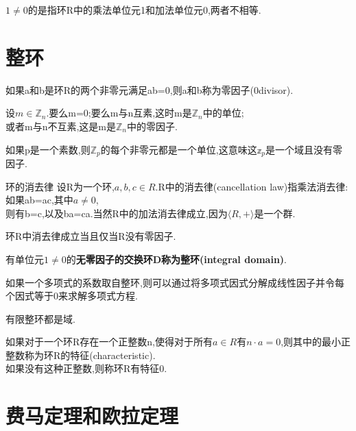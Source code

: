 \documentclass[oneside,openany]{ctexbook}
\begin{document}
$1\neq 0$的是指环R中的乘法单位元1和加法单位元0,两者不相等.

\section{整环}

\begin{definition}{}{}
如果a和b是环R的两个非零元满足ab=0,则a和b称为零因子(0divisor).
\end{definition}

\begin{definition}{}{}
设$m\in \mathbb{Z}_n$.要么m=0;要么m与n互素,这时m是$\mathbb{Z}_n$中的单位;\\
或者m与n不互素,这是m是$\mathbb{Z}_n$中的零因子.
\end{definition}

\begin{definition}{}{}
如果p是一个素数,则$\mathbb{Z}_p$的每个非零元都是一个单位,这意味这$\mathbb{z}_p$是一个域且没有零因子.
\end{definition}

\begin{definition}{环的消去律}{}
设R为一个环,$a,b,c\in R$.R中的消去律\textnormal{(cancellation law)}指乘法消去律:如果ab=ac,其中$a\neq 0$,\\
则有b=c,以及ba=ca.当然R中的加法消去律成立,因为$\langle R,+\rangle$是一个群.
\end{definition}

\begin{definition}{}{}
环R中消去律成立当且仅当R没有零因子.
\end{definition}

\begin{definition}{}{}
有单位元$1\neq 0$的\textbf{无零因子的交换环D称为整环(integral domain)}.
\end{definition}
如果一个多项式的系数取自整环,则可以通过将多项式因式分解成线性因子并令每个因式等于0来求解多项式方程.

\begin{definition}{}{}
有限整环都是域.
\end{definition}

\begin{definition}{}{}
如果对于一个环R存在一个正整数n,使得对于所有$a\in R$有$n\cdot a=0$,则其中的最小正整数称为环R的特征\textnormal{(characteristic)}.\\
如果没有这种正整数,则称环R有特征0.
\end{definition}

\section{费马定理和欧拉定理}
\end{document}
